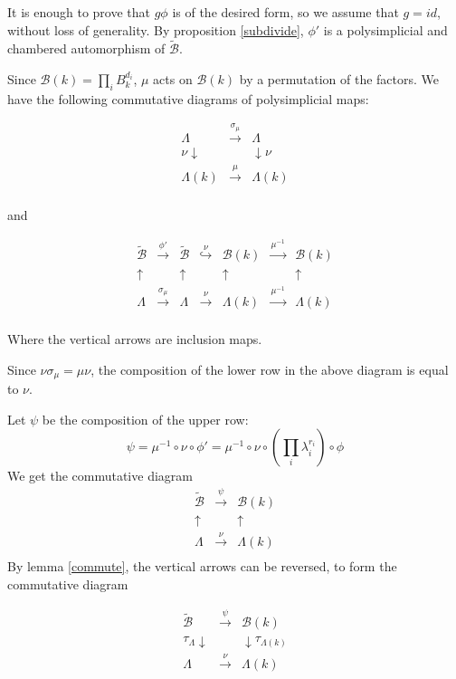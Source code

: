 \documentclass{amsart}
\theoremstyle{theorem}
\theoremstyle{lemma}
\theoremstyle{prop}
\theoremstyle{definition}
\theoremstyle{corollary}
\theoremstyle{remark}
\newcommand{\B}{\mathcal{B}}
\begin{document}
It is enough to prove that $g\phi$ is of the desired form, so we assume that $g=id$, without loss of generality. By proposition \ref{subdivide}, $\phi'$ is a polysimplicial and chambered automorphism of $\tilde{\B}$. 

Since $\B(k)=\prod_i B^{d_i}_k$, $\mu$ acts on $\B(k)$ by a permutation of the factors. We have the following commutative diagrams of polysimplicial maps:

\[\begin{array}{ccc}
\Lambda &\overset{\sigma_\mu}{\rightarrow}&\Lambda\\
\nu \downarrow & & \downarrow \nu \\
\Lambda(k) &  \overset{\mu}{\rightarrow} & \Lambda(k)\\
\end{array}\]

and

\[\begin{array}{ccccccc}
  \tilde{\B} &\overset{\phi'}{\rightarrow}&\tilde{\B}&\overset{\nu}{\hookrightarrow}&\B(k) &\overset{\mu^{-1}}{\rightarrow}&\B(k)\\
  \uparrow & & \uparrow & & \uparrow & & \uparrow \\
  \Lambda &\overset{\sigma_{\mu}}{\rightarrow}&\Lambda& \overset{\nu}{\rightarrow} &\Lambda(k) &\overset{\mu^{-1}}{\rightarrow}&\Lambda(k)\\
 \end{array}\]

Where the vertical arrows are inclusion maps. 

Since $\nu \sigma_\mu = \mu \nu$, the composition of the lower row in the above diagram is equal to $\nu$. 

Let $\psi$ be the composition of the upper row: $$\psi = \mu^{-1} \circ \nu \circ \phi' = \mu^{-1} \circ \nu \circ (\prod_i \lambda_i ^ {r_i}) \circ \phi$$ 
We get the commutative diagram
\[\begin{array}{ccc}
\tilde{\B} &\overset{\psi}{\rightarrow}&\B(k) \\
\uparrow & & \uparrow \\
\Lambda & \overset{\nu}{\rightarrow} & \Lambda(k) \\
\end{array}\]
By lemma \ref{commute}, the vertical arrows can be reversed, to form the commutative diagram

\[\begin{array}{ccc}
\tilde{\B} &\overset{\psi}{\rightarrow}&\B(k) \\
\tau_\Lambda \downarrow & & \downarrow \tau_{\Lambda(k)}\\
\Lambda & \overset{\nu}{\rightarrow} & \Lambda(k) \\
\end{array}\]
\end{document}
